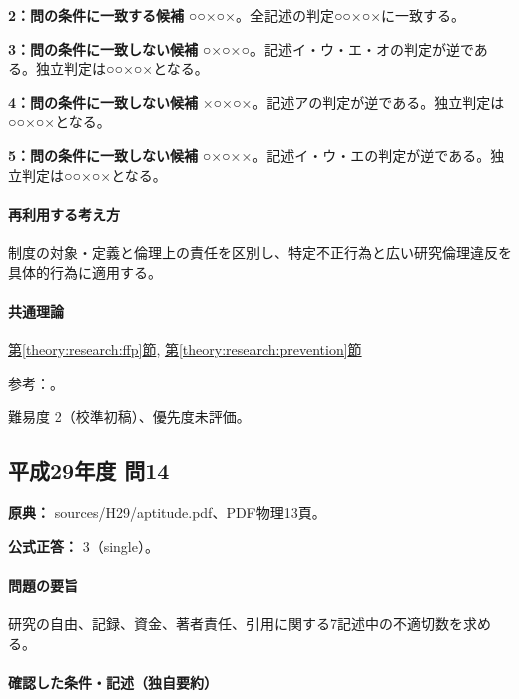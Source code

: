 \noindent\textbf{2：問の条件に一致する候補} ○○×○×。全記述の判定○○×○×に一致する。\par

\noindent\textbf{3：問の条件に一致しない候補} ○×○×○。記述イ・ウ・エ・オの判定が逆である。独立判定は○○×○×となる。\par

\noindent\textbf{4：問の条件に一致しない候補} ×○×○×。記述アの判定が逆である。独立判定は○○×○×となる。\par

\noindent\textbf{5：問の条件に一致しない候補} ○×○××。記述イ・ウ・エの判定が逆である。独立判定は○○×○×となる。\par

\paragraph{再利用する考え方} 制度の対象・定義と倫理上の責任を区別し、特定不正行為と広い研究倫理違反を具体的行為に適用する。

\paragraph{共通理論} \hyperref[theory:research:ffp]{第\ref*{theory:research:ffp}節}, \hyperref[theory:research:prevention]{第\ref*{theory:research:prevention}節}

\par 参考：\cite{mext_misconduct2014}。

\par 難易度 2（校準初稿）、優先度未評価。

\subsection{平成29年度 問14}
\label{q:h29-reg-apt-14}

\noindent\textbf{原典：} sources/H29/aptitude.pdf、PDF物理13頁。

\textbf{公式正答：} 3（single）。

\paragraph{問題の要旨} 研究の自由、記録、資金、著者責任、引用に関する7記述中の不適切数を求める。

\paragraph{確認した条件・記述（独自要約）}\mbox{}\par

